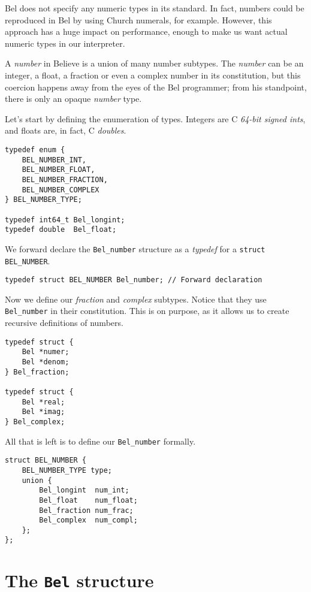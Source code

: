 \documentclass[openright,a4paper,twoside,12pt]{memoir}
\begin{document}
Bel does not specify any numeric types in its standard. In fact,
numbers could be reproduced in Bel by using Church numerals, for
example. However, this approach has a huge impact on performance,
enough to make us want actual numeric types in our interpreter.

A \emph{number} in Believe is a union of many number subtypes. The \emph{number} can
be an integer, a float, a fraction or even a complex number in its
constitution, but this coercion happens away from the eyes of the Bel
programmer; from his standpoint, there is only an opaque \emph{number} type.

Let's start by defining the enumeration of types. Integers are C
\emph{64-bit signed ints}, and floats are, in fact, C \emph{doubles}.

\begin{verbatim}
typedef enum {
    BEL_NUMBER_INT,
    BEL_NUMBER_FLOAT,
    BEL_NUMBER_FRACTION,
    BEL_NUMBER_COMPLEX
} BEL_NUMBER_TYPE;

typedef int64_t Bel_longint;
typedef double  Bel_float;
\end{verbatim}

We forward declare the \texttt{Bel\_number} structure as a \emph{typedef} for a \texttt{struct
BEL\_NUMBER}.

\begin{verbatim}
typedef struct BEL_NUMBER Bel_number; // Forward declaration
\end{verbatim}

Now we define our \emph{fraction} and \emph{complex} subtypes. Notice that they use
\texttt{Bel\_number} in their constitution. This is on purpose, as it allows us
to create recursive definitions of numbers.

\begin{verbatim}
typedef struct {
    Bel *numer;
    Bel *denom;
} Bel_fraction;

typedef struct {
    Bel *real;
    Bel *imag;
} Bel_complex;
\end{verbatim}

All that is left is to define our \texttt{Bel\_number} formally.

\begin{verbatim}
struct BEL_NUMBER {
    BEL_NUMBER_TYPE type;
    union {
        Bel_longint  num_int;
        Bel_float    num_float;
        Bel_fraction num_frac;
        Bel_complex  num_compl;
    };
};
\end{verbatim}

\section{The \texttt{Bel} structure}
\label{sec:orgd9a47c1}
\end{document}
